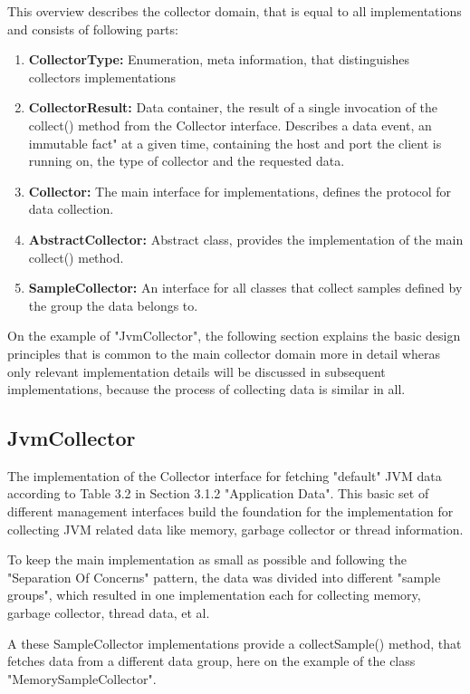 This overview describes the collector domain, that is equal to all implementations and consists of following parts:
\begin{enumerate}
    \item \textbf{CollectorType:}
    Enumeration, meta information, that distinguishes collectors implementations
    \item \textbf{CollectorResult:} Data container, the result of a single invocation of the collect() method from
    the Collector interface. Describes a data event, an immutable fact" at a given time, containing the host and port
    the client is running on, the type of collector and the requested data.
    \item \textbf{Collector:} The main interface for implementations, defines the protocol for data collection.
    \item \textbf{AbstractCollector:} Abstract class, provides the implementation of the main collect() method.
    \item \textbf{SampleCollector:} An interface for all classes that collect samples defined by the group the data
    belongs to.
\end{enumerate}

On the example of "JvmCollector", the following section explains the basic design principles that is common
to the main collector domain more in detail wheras only relevant implementation details will be discussed in
subsequent implementations, because the process of collecting data is similar in all.

\subsection{JvmCollector}

The implementation of the Collector interface for fetching "default" JVM data according to Table 3.2 in
Section 3.1.2 "Application Data". This basic set of different management interfaces build the foundation
for the implementation for collecting JVM related data like memory, garbage collector or thread information.

To keep the main implementation as small as possible and following the "Separation Of Concerns" pattern,
the data was divided into different "sample groups", which resulted in one implementation each for collecting
memory, garbage collector, thread data, et al.

A these SampleCollector implementations provide a collectSample() method, that fetches data from a different data group, here
on the example of the class "MemorySampleCollector".

